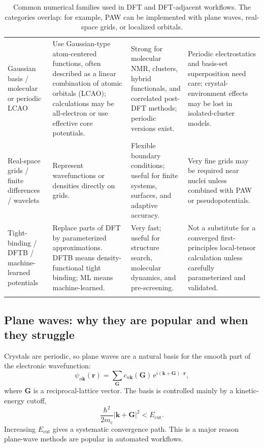 \documentclass[11pt]{article}
\newcommand{\ee}{\mathrm{e}}
\begin{document}
\begin{longtable}{@{}L{0.21\textwidth}L{0.25\textwidth}L{0.24\textwidth}L{0.22\textwidth}@{}}
Gaussian basis / molecular or periodic LCAO & Use Gaussian-type atom-centered functions, often described as a linear combination of atomic orbitals (LCAO); calculations may be all-electron or use effective core potentials. & Strong for molecular NMR, clusters, hybrid functionals, and correlated post-DFT methods; periodic versions exist. & Periodic electrostatics and basis-set superposition need care; crystal-environment effects may be lost in isolated-cluster models. \\
Real-space grids / finite differences / wavelets & Represent wavefunctions or densities directly on grids. & Flexible boundary conditions; useful for finite systems, surfaces, and adaptive accuracy. & Very fine grids may be required near nuclei unless combined with PAW or pseudopotentials. \\
Tight-binding / DFTB / machine-learned potentials & Replace parts of DFT by parameterized approximations.  DFTB means density-functional tight binding; ML means machine-learned. & Very fast; useful for structure search, molecular dynamics, and pre-screening. & Not a substitute for a converged first-principles local-tensor calculation unless carefully parameterized and validated. \\
\bottomrule
\caption{Common numerical families used in DFT and DFT-adjacent workflows.  The categories overlap: for example, PAW can be implemented with plane waves, real-space grids, or localized orbitals.}
\label{tab:method-families}
\end{longtable}

\subsection{Plane waves: why they are popular and when they struggle}

Crystals are periodic, so plane waves are a natural basis for the smooth part of the electronic wavefunction:
\begin{equation}
\psi_{n\mathbf k}(\mathbf r)=\sum_{\mathbf G} c_{n\mathbf k}(\mathbf G)\,
\ee^{i(\mathbf k+\mathbf G)\cdot\mathbf r},
\end{equation}
where $\mathbf G$ is a reciprocal-lattice vector.  The basis is controlled mainly by a kinetic-energy cutoff,
\begin{equation}
\frac{\hbar^2}{2m_e}|\mathbf k+\mathbf G|^2 < E_{\mathrm{cut}}.
\end{equation}
Increasing $E_{\mathrm{cut}}$ gives a systematic convergence path.  This is a major reason plane-wave methods are popular in automated workflows.
\end{document}
